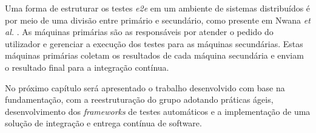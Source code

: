 Uma forma de estruturar os testes \emph{e2e} em um ambiente de sistemas distribuídos é por meio de uma divisão entre primário e secundário, como presente em Nwana \emph{et al.} \cite{nwana}. As máquinas primárias são as responsáveis por atender o pedido do utilizador e gerenciar a execução dos testes para as máquinas secundárias. Estas máquinas primárias coletam os resultados de cada máquina secundária e enviam o resultado final para a integração contínua.

No próximo capítulo será apresentado o trabalho desenvolvido com base na fundamentação, com a reestruturação do grupo adotando práticas ágeis, desenvolvimento dos \emph{frameworks} de testes automáticos e a implementação de uma solução de integração e entrega contínua de software.
